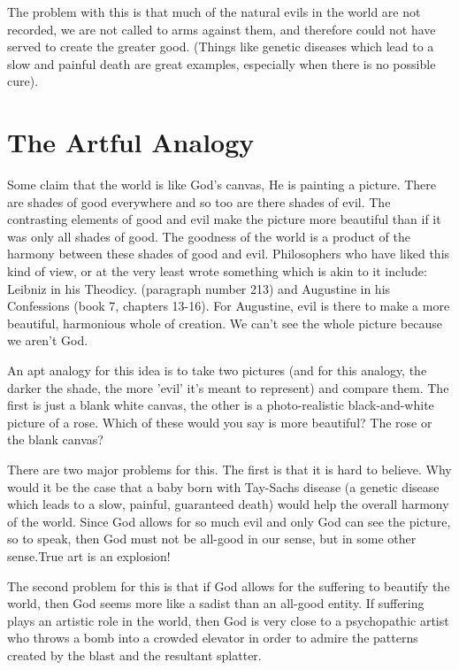 The problem with this is that much of the natural evils in the world are not recorded, we are not called to arms against them, and therefore could not have served to create the greater good. (Things like genetic diseases which lead to a slow and painful death are great examples, especially when there is no possible cure).

\section{The Artful Analogy}
Some claim that the world is like God’s canvas, He is painting a picture. There are shades of good everywhere and so too are there shades of evil. The contrasting elements of good and evil make the picture more beautiful than if it was only all shades of good. The goodness of the world is a product of the harmony between these shades of good and evil. Philosophers who have liked this kind of view, or at the very least wrote something which is akin to it include: Leibniz in his Theodicy\autocite{Leibniz1}. (paragraph number 213) and Augustine in his Confessions (book 7, chapters 13-16).\autocite{Augustine1} For Augustine, evil is there to make a more beautiful, harmonious whole of creation. We can't see the whole picture because we aren't God. 

An apt analogy for this idea is to take two pictures (and for this analogy, the darker the shade, the more 'evil' it's meant to represent) and compare them. The first is just a blank white canvas, the other is a photo-realistic black-and-white picture of a rose. Which of these would you say is more beautiful? The rose or the blank canvas?

There are two major problems for this. The first is that it is hard to believe. Why would it be the case that a baby born with Tay-Sachs disease (a genetic disease which leads to a slow, painful, guaranteed death) would help the overall harmony of the world. Since God allows for so much evil and only God can see the picture, so to speak, then God must not be all-good in our sense, but in some other sense.True art is an explosion!

The second problem for this is that if God allows for the suffering to beautify the world, then God seems more like a sadist than an all-good entity. If suffering plays an artistic role in the world, then God is very close to a psychopathic artist who throws a bomb into a crowded elevator in order to admire the patterns created by the blast and the resultant splatter.

